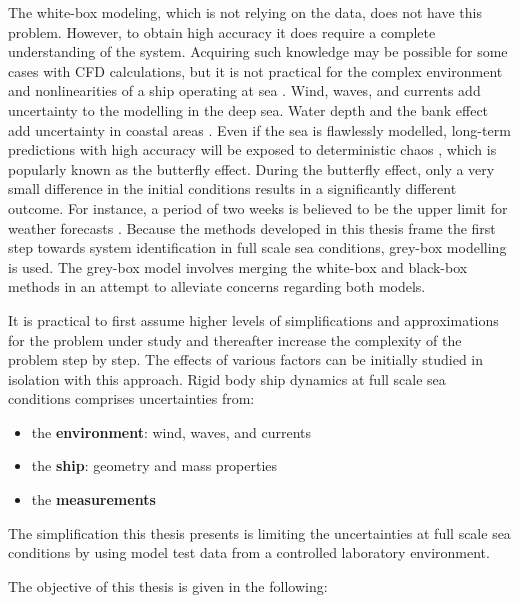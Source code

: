 The white-box modeling, which is not relying on the data, does not have this problem. However, to obtain high accuracy it does require a complete understanding of the system. Acquiring such knowledge may be possible for some cases with CFD calculations, but it is not practical for the complex environment and nonlinearities of a ship operating at sea \cite{miller_ship_2021}. 
Wind, waves, and currents add uncertainty to the modelling in the deep sea. Water depth and the bank effect add uncertainty in coastal areas \cite{nielsen_machine_2022}. 
Even if the sea is flawlessly modelled, long-term predictions with high accuracy will be exposed to deterministic chaos \cite{lorenz_deterministic_1963}, which is popularly known as the butterfly effect. During the butterfly effect, only a very small difference in the initial conditions results in a significantly different outcome. For instance, a period of two weeks is believed to be the upper limit for weather forecasts  \cite{zhang_what_2019}. Because the methods developed in this thesis frame the first step towards system identification in full scale sea conditions, grey-box modelling is used. The grey-box model involves merging the white-box and black-box methods in an attempt to alleviate concerns regarding both models. 

It is practical to first assume higher levels of simplifications and approximations for the problem under study and thereafter increase the complexity of the problem step by step. The effects of various factors can be initially studied in isolation with this approach. 
Rigid body ship dynamics at full scale sea conditions comprises uncertainties from:
\vspace{5pt}
\begin{itemize}
    \setlength\itemsep{5pt}
    \item the \textbf{environment}: wind, waves, and currents
    \item the \textbf{ship}: geometry and mass properties
    \item the \textbf{measurements}
\end{itemize}
\vspace{5pt}

\noindent The simplification this thesis presents is limiting the uncertainties at full scale sea conditions by using model test data from a controlled laboratory environment. 



The objective of this thesis is given in the following:
\vspace{0.2cm}
\begin{tcolorbox}[sharp corners,title=Objective]
    \objective
    \tcblower
\end{tcolorbox}
\vspace{0.3cm}

